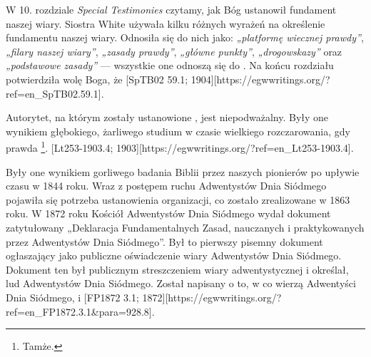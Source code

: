  \label{chap:authority}

W 10. rozdziale \textit{Special Testimonies} czytamy, jak Bóg ustanowił fundament naszej wiary. Siostra White używała kilku różnych wyrażeń na określenie fundamentu naszej wiary. Odnosiła się do nich jako: \textit{„platformę wiecznej prawdy”}, \textit{„filary naszej wiary”}, \textit{„zasady prawdy”}, \textit{„główne punkty”}, \textit{„drogowskazy”} oraz \textit{„podstawowe zasady”} — wszystkie one odnoszą się do . Na końcu rozdziału potwierdziła wolę Boga, że [SpTB02 59.1; 1904][https://egwwritings.org/?ref=en\_SpTB02.59.1].

Autorytet, na którym zostały ustanowione , jest niepodważalny. Były one wynikiem głębokiego, żarliwego studium w czasie wielkiego rozczarowania, gdy prawda \footnote{Tamże.}. [Lt253-1903.4; 1903][https://egwwritings.org/?ref=en\_Lt253-1903.4].

Były one wynikiem gorliwego badania Biblii przez naszych pionierów po upływie czasu w 1844 roku. Wraz z postępem ruchu Adwentystów Dnia Siódmego pojawiła się potrzeba ustanowienia organizacji, co zostało zrealizowane w 1863 roku. W 1872 roku Kościół Adwentystów Dnia Siódmego wydał dokument zatytułowany „Deklaracja Fundamentalnych Zasad, nauczanych i praktykowanych przez Adwentystów Dnia Siódmego”. Był to pierwszy pisemny dokument ogłaszający  jako publiczne oświadczenie wiary Adwentystów Dnia Siódmego. Dokument ten był publicznym streszczeniem wiary adwentystycznej i określał,  lud Adwentystów Dnia Siódmego. Został napisany  o to, w co wierzą Adwentyści Dnia Siódmego,  i [FP1872 3.1; 1872][https://egwwritings.org/?ref=en\_FP1872.3.1&para=928.8].

